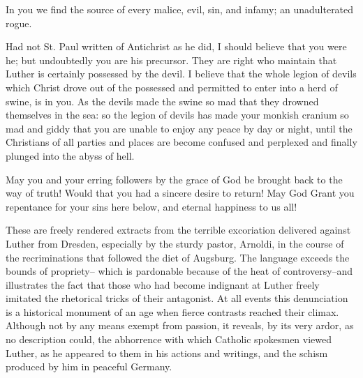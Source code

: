 In you we find the source of every malice, evil, sin, and infamy; an unadulterated rogue.

Had not St. Paul written of Antichrist as he did, I should believe that you
were he; but undoubtedly you are his precursor. They are right who maintain
that Luther is certainly possessed by the devil. I believe that the whole
legion of devils which Christ drove out of the possessed and permitted to
enter into a herd of swine, is in you. As the devils made the swine so mad
that they drowned themselves in the sea: so the legion of devils has made
your monkish cranium so mad and giddy that you are unable to enjoy any
peace by day or night, until the Christians of all parties and places are become
confused and perplexed and finally plunged into the abyss of hell.

May you and your erring followers by the grace of God be brought back
to the way of truth! Would that you had a sincere desire to return! May
God Grant you repentance for your sins here below, and eternal happiness
to us all!

These are freely rendered extracts from the terrible excoriation
delivered against Luther from Dresden, especially by the sturdy
pastor, Arnoldi, in the course of the recriminations that followed the
diet of Augsburg. The language exceeds the bounds of propriety--
which is pardonable because of the heat of controversy--and illustrates
the fact that those who had become indignant at Luther freely
imitated the rhetorical tricks of their antagonist. At all events this
denunciation is a historical monument of an age when fierce contrasts
reached their climax. Although not by any means exempt from
passion, it reveals, by its very ardor, as no description could, the abhorrence
with which Catholic spokesmen viewed Luther, as he appeared to them in
his actions and writings, and the schism produced
by him in peaceful Germany.

